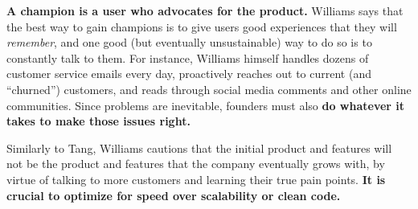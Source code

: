 \textbf{A champion is a user who advocates for the product.}
Williams says that the best way to gain champions is to give users good experiences that they will \textit{remember}, and one good (but eventually unsustainable) way to do so is to constantly talk to them.
For instance, Williams himself handles dozens of customer service emails every day, proactively reaches out to current (and ``churned'') customers, and reads through social media comments and other online communities.
Since problems are inevitable, founders must also \textbf{do whatever it takes to make those issues right.}

Similarly to Tang, Williams cautions that the initial product and features will not be the product and features that the company eventually grows with, by virtue of talking to more customers and learning their true pain points.
\textbf{It is crucial to optimize for speed over scalability or clean code.}

